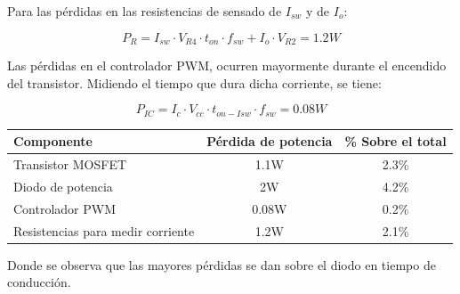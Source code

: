 \documentclass[e4_tp2_main.tex]{subfiles}
\begin{document}
Para las pérdidas en las resistencias de sensado de $I_{sw}$ y de $I_o$:

\[
P_{R} = I_{sw} \cdot V_{R4} \cdot t_{on} \cdot f_{sw} + I_o \cdot V_{R2} = 1.2W  
\]

Las pérdidas en el controlador PWM, ocurren mayormente durante el encendido del transistor. Midiendo el tiempo que dura dicha corriente, se tiene:

\[
P_{IC} = I_c \cdot V_{cc} \cdot t_{on-Isw} \cdot f_{sw} = 0.08W
\]

\begin{table}[h]
\centering
\begin{tabular}{|l|c|c|}
\hline
Componente                        & \multicolumn{1}{l|}{Pérdida de potencia} & \multicolumn{1}{l|}{\% Sobre el total} \\ \hline
Transistor MOSFET                 & 1.1W                                     & 2.3\%                                  \\ \hline
Diodo de potencia                 & 2W                                       & 4.2\%                                  \\ \hline
Controlador PWM                   & 0.08W                                    & 0.2\%                                  \\ \hline
Resistencias para medir corriente & 1.2W                                       & 2.1\%                                  \\ \hline
\end{tabular}
\end{table}

Donde se observa que las mayores pérdidas se dan sobre el diodo en tiempo de conducción.
\end{document}
